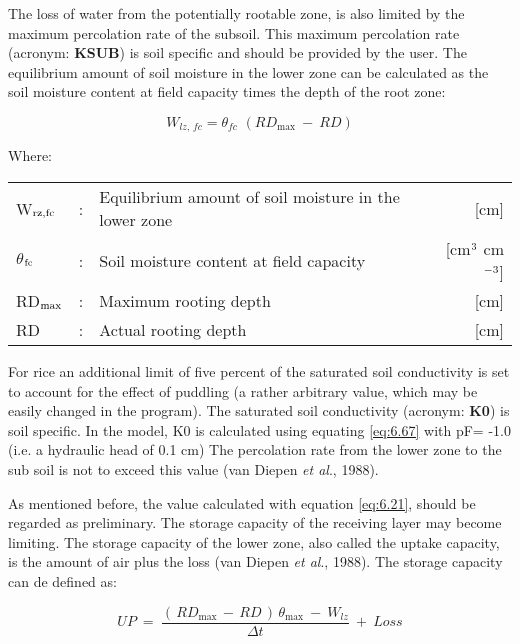 The loss of water from the potentially rootable zone, is also limited by the maximum
percolation rate of the subsoil. This maximum percolation rate (acronym: {\bf KSUB}) is soil
specific and should be provided by the user. The equilibrium amount of soil moisture in
the lower zone can be calculated as the soil moisture content at field capacity times the
depth of the root zone:

\begin{equation}
\label{eq:6.24}
W_{lz,\, fc} = \theta_{fc} \,\, (RD_{\max} ~-~RD)
\end{equation}

Where:\\[5pt]
\begin{tabularx}{\textwidth}{llXr}
W$_{{\rm rz,fc}}$ &:& Equilibrium amount of soil moisture in the lower zone  & [cm]\\
$\theta$$_{{\rm fc}}$ &:& Soil moisture content at field capacity  & [cm$^{{\rm 3}}$ cm$^{{\rm -3}}$]\\
RD$_{{\rm max}}$ &:& Maximum rooting depth  & [cm]\\
RD &:& Actual rooting depth  & [cm]\\
\end{tabularx}

For rice an additional limit of five percent of the saturated soil conductivity is set to
account for the effect of puddling (a rather arbitrary value, which may be easily changed
in the program). The saturated soil conductivity (acronym: {\bf K0}) is soil specific. In the
model, K0 is calculated using equating \ref{eq:6.67} with pF= -1.0 (i.e. a hydraulic head of 0.1
cm) The percolation rate from the lower zone to the sub soil is not to exceed this value
(van Diepen {\it et al}., 1988). 

As mentioned before, the value calculated with equation \ref{eq:6.21}, should be regarded as
preliminary. The storage capacity of the receiving layer may become limiting. The
storage capacity of the lower zone, also called the uptake capacity, is the amount of air
plus the loss (van Diepen {\it et al}., 1988). The storage capacity can de defined as:

\begin{equation}
\label{eq:6.25}
UP  ~=~{\frac{(\, RD _{\max } \, -\, RD\, )\, \theta  _{\max } ~-~ W _{lz} }{\Delta t}} ~+~ Loss
\end{equation}

